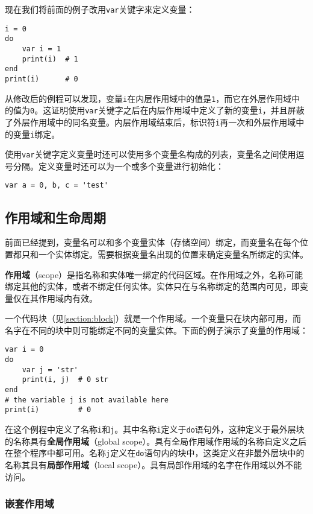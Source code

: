 现在我们将前面的例子改用\texttt{var}关键字来定义变量：
\begin{lstlisting}[language=berry]
i = 0
do
    var i = 1
    print(i)  # 1
end
print(i)      # 0
\end{lstlisting}
从修改后的例程可以发现，变量\texttt{i}在内层作用域中的值是\texttt{1}，而它在外层作用域中的值为\texttt{0}。这证明使用\texttt{var}关键字之后在内层作用域中定义了新的变量\texttt{i}，并且屏蔽了外层作用域中的同名变量。内层作用域结束后，标识符\texttt{i}再一次和外层作用域中的变量\texttt{i}绑定。

使用\texttt{var}关键字定义变量时还可以使用多个变量名构成的列表，变量名之间使用逗号分隔。定义变量时还可以为一个或多个变量进行初始化：
\begin{lstlisting}[language=berry, numbers=none]
var a = 0, b, c = 'test'
\end{lstlisting}

\subsection{作用域和生命周期} \label{section::scope_life}

前面已经提到，变量名可以和多个变量实体（存储空间）绑定，而变量名在每个位置都只和一个实体绑定。需要根据变量名出现的位置来确定变量名所绑定的实体。

\textbf{作用域}（scope）是指名称和实体唯一绑定的代码区域。在作用域之外，名称可能绑定其他的实体，或者不绑定任何实体。实体只在与名称绑定的范围内可见，即变量仅在其作用域内有效。

一个代码块（见\ref{section:block}）就是一个作用域。一个变量只在块内部可用，而名字在不同的块中则可能绑定不同的变量实体。下面的例子演示了变量的作用域：
\begin{lstlisting}[language=berry]
var i = 0
do
    var j = 'str'
    print(i, j)  # 0 str
end
# the variable j is not available here
print(i)         # 0
\end{lstlisting}
在这个例程中定义了名称\texttt{i}和\texttt{j}。其中名称\texttt{i}定义于\texttt{do}语句外，这种定义于最外层块的名称具有\textbf{全局作用域}（global scope）。具有全局作用域作用域的名称自定义之后在整个程序中都可用。名称\texttt{j}定义在\texttt{do}语句内的块中，这类定义在非最外层块中的名称其具有\textbf{局部作用域}（local scope）。具有局部作用域的名字在作用域以外不能访问。

\subsubsection{嵌套作用域}


